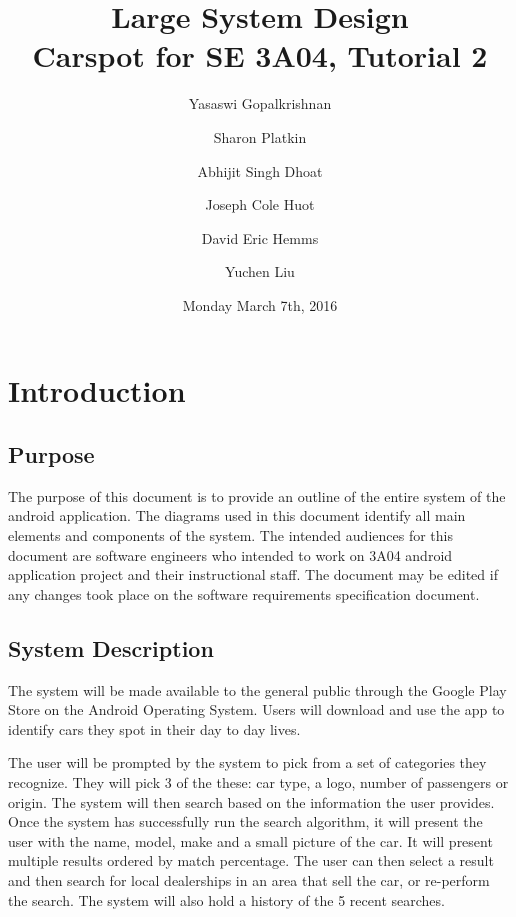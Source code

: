 \documentclass[12pt]{article}
\title{Large System Design\\
	\large Carspot for SE 3A04, Tutorial 2}
\author{
         Yasaswi Gopalkrishnan\\ \newline
         \and
         Sharon Platkin \\ \newline
         \and
         Abhijit Singh Dhoat\\ \newline
         \and
         Joseph Cole Huot\\ \newline
         \and
         David Eric Hemms\\ \newline
         \and
         Yuchen Liu\\ \newline
    }
\date{Monday March 7th, 2016}
\begin{document}
\maketitle
\newpage
\tableofcontents
\listoftables
\newpage

\section{Introduction}
\label{sec:introduction}

\subsection{Purpose}
\label{sub:purpose}

	The purpose of this document is to provide an outline of the entire system of the android application. The diagrams used in this document identify all main elements and components of the system. The intended audiences for this document are software engineers who intended to work on 3A04 android application project and their instructional staff. The document may be edited if any changes took place on the software requirements specification document.


\subsection{System Description}
\label{sub:system_description}
	The system will be made available to the general public through the Google Play Store on the Android Operating System. Users will download and use the app to identify cars they spot in their day to day lives. 

	The user will be prompted by the system to pick from a set of categories they recognize. They will pick 3 of the these: car type, a logo, number of passengers or origin. The system will then search based on the information the user provides. Once the system has successfully run the search algorithm, it will present the user with the name, model, make and a small picture of the car. It will present multiple results ordered by match percentage. The user can then select a result and then search for local dealerships in an area that sell the car, or re-perform the search. The system will also hold a history of the 5 recent searches.
\end{document}
